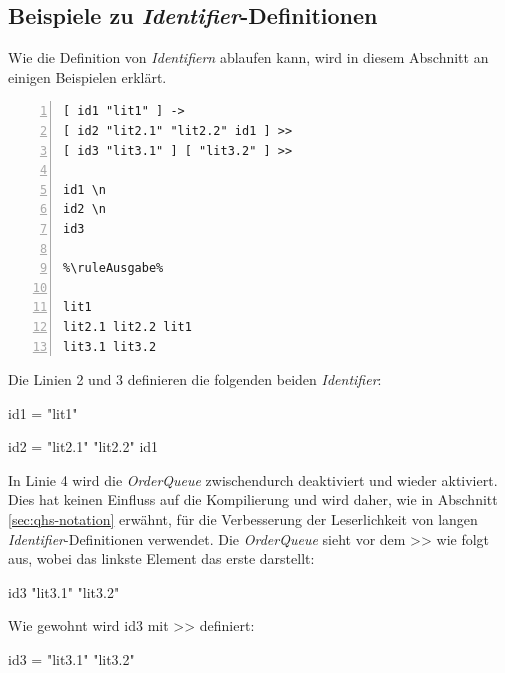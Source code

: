 \subsection{Beispiele zu \textit{Identifier}-Definitionen} \label{sec:howto-identifiers}
Wie die Definition von \textit{Identifiern} ablaufen kann, wird in diesem Abschnitt an einigen Beispielen erklärt.

\begin{minipage}{\linewidth}
\begin{multicols}{2}
\begin{lstlisting}[language=QHS, label=eg:howto_id1-3, caption=Beispiel zu gewöhnlichen \textit{Identifier}-Definitionen, numbers=left, stepnumber=1]
%\ruleEingabe%
[ id1 "lit1" ] ->
[ id2 "lit2.1" "lit2.2" id1 ] >>
[ id3 "lit3.1" ] [ "lit3.2" ] >>

id1 \n
id2 \n
id3

%\ruleAusgabe%

lit1
lit2.1 lit2.2 lit1
lit3.1 lit3.2
\end{lstlisting}
\columnbreak

Die Linien 2 und 3 definieren die folgenden beiden \textit{Identifier}: \break
\centerline{\selectListingFont id1 = "lit1"{}}
\centerline{\selectListingFont id2 = "lit2.1"{} "lit2.2"{} id1}
In Linie 4 wird die \textit{OrderQueue} zwischendurch deaktiviert und wieder aktiviert.
Dies hat keinen Einfluss auf die Kompilierung und wird daher, wie in Abschnitt \ref{sec:qhs-notation} erwähnt, für die Verbesserung der Leserlichkeit von langen \textit{Identifier}-Definitionen verwendet.
Die \textit{OrderQueue} sieht vor dem {\selectListingFont >>} wie folgt aus, wobei das linkste Element das erste darstellt:  \break
\centerline{\selectListingFont id3 "lit3.1"{} "lit3.2"{}}
Wie gewohnt wird {\selectListingFont id3} mit {\selectListingFont >>} definiert: \break
\centerline{\selectListingFont id3 = "lit3.1"{} "lit3.2"{}}
\end{multicols}
\end{minipage}
\vspace{\baselineskip}

